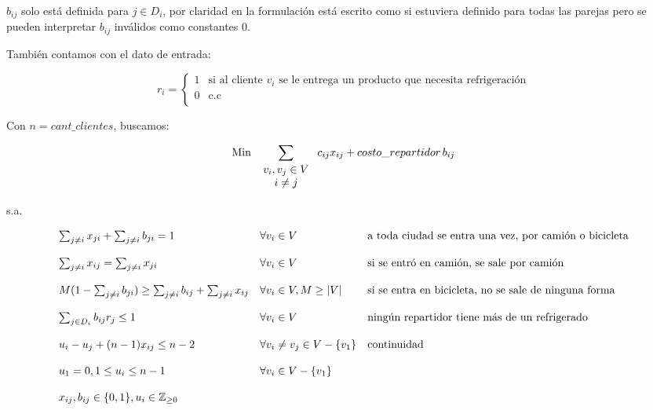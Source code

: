 \documentclass[10pt]{article}
\begin{document}
	$b_{ij}$ solo está definida para $j \in D_i$, por claridad en la formulación está escrito como si estuviera definido para todas las parejas pero se pueden interpretar $b_{ij}$ inválidos como constantes 0.

	También contamos con el dato de entrada:

	\[
		r_{i} = \begin{cases}
			1 & \text{si al cliente $v_i$ se le entrega un producto que necesita refrigeración}\\
			0 & \text{c.c}\\
		\end{cases}
	\]

	Con $n = cant\_clientes$, buscamos:

	\[
		\text{Min } \sum_{ \begin{tabular}{c}
				$v_i, v_j \in V$ \\
				$ i \neq j$
		\end{tabular}
		} c_{ij} x_{ij} + costo\_repartidor\,b_{ij}
	\]

	s.a.

	\[
	\begin{array}{l l l}
		\sum_{j \neq i} x_{ji} + \sum_{j \neq i} b_{ji} = 1 & \forall v_i \in V & \text{a toda ciudad se entra una vez, por camión o bicicleta} \\
		\\
		\sum_{j \neq i} x_{ij} = \sum_{j\neq i} x_{ji} & \forall v_i \in V & \text{si se entró en camión, se sale por camión} \\
		\\
		M(1 - \sum_{j \neq i} b_{ji}) \geq \sum_{j \neq i} b_{ij} + \sum_{j \neq i} x_{ij} & \forall v_i \in V, M \geq |V| & \text{si se entra en bicicleta, no se sale de ninguna forma} \\
		\\
		\sum_{j \in D_i} b_{ij} r_j \leq 1 & \forall v_i \in V & \text{ningún repartidor tiene más de un refrigerado} \\
		\\
		u_i - u_j + (n - 1) x_{ij} \leq n - 2 & \forall v_i \neq v_j \in V - \{v_1\} & \text{continuidad} \\
		\\
		u_1 = 0, 1 \leq u_i \leq n-1 & \forall v_i \in V - \{v_1\} \\
		\\
		x_{ij}, b_{ij} \in \{0,1\}, u_i \in \mathbb{Z}_{\geq 0}
	\end{array}
	\]
	
\end{document}
